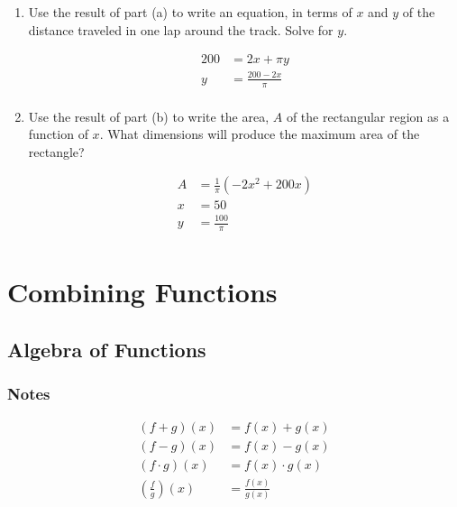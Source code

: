 \documentclass{exam}
\begin{document}
\begin{enumerate}
\begin{enumerate}[a]
      \item Use the result of part (a) to write an equation, in terms of $x$ and $y$ of the distance traveled in one lap
        around the track.  Solve for $y$.
        \begin{solution}
          \begin{align*}
            200 &= 2x + \pi y \\
            y &= \frac{200 - 2x}{\pi} \\
          \end{align*}
        \end{solution}

      \item Use the result of part (b) to write the area, $A$ of the rectangular region as a function of $x$.  What
        dimensions will produce the maximum area of the rectangle?
        \begin{solution}
          \begin{align*}
            A &= \frac{1}{\pi} (-2x^2 + 200x ) \\
            x &= 50 \\
            y &= \frac{100}{\pi} \\
          \end{align*}
        \end{solution}
    \end{enumerate}
\end{enumerate}

\pagebreak

\section{Combining Functions}

\subsection{Algebra of Functions}
\subsubsection{Notes}

\begin{align*}
  (f + g)(x)                    &= f(x) + g(x) \\
  (f - g)(x)                    &= f(x) - g(x) \\
  (f \cdot g)(x)                &= f(x) \cdot g(x) \\
  \left( \frac{f}{g} \right)(x) &= \frac{f(x)}{g(x)} \\
\end{align*}
\end{document}
